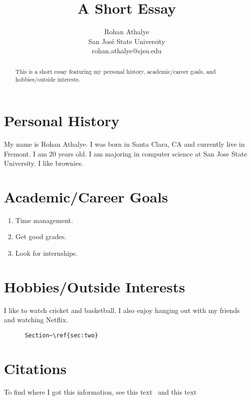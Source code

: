 \documentclass{article}
\title{A Short Essay}
\author{
  Rohan Athalye \\
  San Jos\'{e} State University \\
  rohan.athalye@sjsu.edu
  }
\begin{document}
\maketitle

\begin{abstract}
This is a short essay featuring my personal history, academic/career goals, 
and hobbies/outside interests.
\end{abstract}

\section{Personal History}
My name is Rohan Athalye. I was born in Santa Clara, CA and currently live in
Fremont. I am 20 years old. I am majoring in computer science at San Jose
State University. I like brownies.

\section{Academic/Career Goals}
\label{sec:two}
\begin{enumerate}
  \item Time management.
  \item Get good grades.
  \item Look for internships.
\end{enumerate}

\section{Hobbies/Outside Interests}
I like to watch cricket and basketball. I also enjoy hanging out with my friends
and watching Netflix.
\begin{verbatim}
      Section~\ref{sec:two}
\end{verbatim}

\section{Citations}\label{sec:bibtex}
To find where I got this information,
see this text~\cite{lamport} and this text~\cite{literate}
\end{document}
